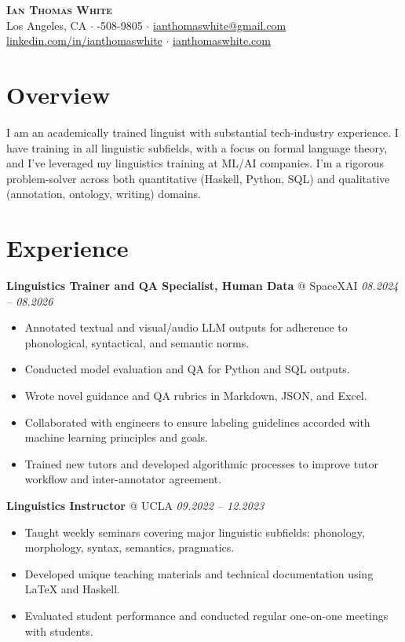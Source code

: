 \documentclass[10pt,letterpaper]{article}
\begin{document}
\thispagestyle{empty}

\begin{center}
    {\LARGE \textsc{\textbf{Ian Thomas White}}}\\[0.35em]
    Los Angeles, CA \quad $\cdot$ -508-9805 \quad $\cdot$ \quad \href{mailto:ianthomaswhite@gmail.com}{ianthomaswhite@gmail.com}\\[0.2em]
    \href{https://www.linkedin.com/in/ianthomaswhite/}{linkedin.com/in/ianthomaswhite} \quad $\cdot$ \quad \href{https://ianthomaswhite.com}{ianthomaswhite.com}
\end{center}
\vspace{0.3em}

\section*{Overview}
I am an academically trained linguist with substantial tech-industry experience. I have training in all linguistic subfields, with a focus on formal language theory, and I've leveraged my linguistics training at ML/AI companies. I'm a rigorous problem-solver across both quantitative (Haskell, Python, SQL) and qualitative (annotation, ontology, writing) domains.

\section*{Experience}

\noindent\textbf{Linguistics Trainer and QA Specialist, Human Data} @ SpaceXAI \hfill \textit{08.2024 -- 08.2026}
\begin{itemize}[leftmargin=1.3em, itemsep=1.5pt, parsep=0pt, topsep=2pt]
    \item Annotated textual and visual/audio LLM outputs for adherence to phonological, syntactical, and semantic norms.
    \item Conducted model evaluation and QA for Python and SQL outputs.
    \item Wrote novel guidance and QA rubrics in Markdown, JSON, and Excel.
    \item Collaborated with engineers to ensure labeling guidelines accorded with machine learning principles and goals.
    \item Trained new tutors and developed algorithmic processes to improve tutor workflow and inter-annotator agreement.
\end{itemize}

\vspace{0.4em}
\noindent\textbf{Linguistics Instructor} @ UCLA \hfill \textit{09.2022 -- 12.2023}
\begin{itemize}[leftmargin=1.3em, itemsep=1.5pt, parsep=0pt, topsep=2pt]
    \item Taught weekly seminars covering major linguistic subfields: phonology, morphology, syntax, semantics, pragmatics.
    \item Developed unique teaching materials and technical documentation using LaTeX and Haskell.
    \item Evaluated student performance and conducted regular one-on-one meetings with students.
\end{itemize}
\end{document}
